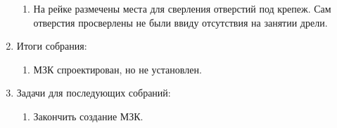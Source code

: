 \begin{enumerate}
\begin{enumerate}
      \item На рейке размечены места для сверления отверстий под крепеж. Сам отверстия просверлены не были ввиду отсутствия на занятии дрели.
      
    \end{enumerate}
    
	\item Итоги собрания: 
	\begin{enumerate}
	  \item МЗК спроектирован, но не установлен.
      
    \end{enumerate}
    
	\item Задачи для последующих собраний:
	\begin{enumerate}
	  \item Закончить создание МЗК.
	  
    \end{enumerate}     
\end{enumerate}
\fillpage
